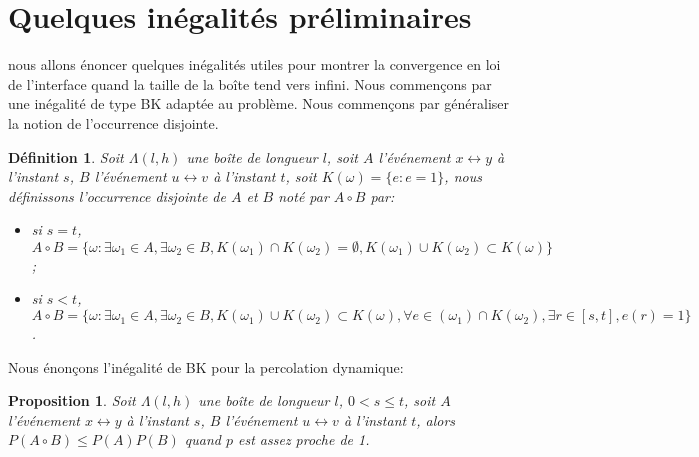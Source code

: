 \documentclass[titlepage,a4paper,12pt]{article}
\newcounter{def}
\newcounter{prop}
\newtheorem{occ}[def]{Définition}
\newtheorem{bk}[prop]{Proposition}
\begin{document}
\section{Quelques inégalités préliminaires}
nous allons énoncer quelques inégalités utiles pour montrer la convergence en loi de l'interface quand la taille de la boîte tend vers infini. Nous commençons par une inégalité de type BK adaptée au problème. Nous commençons par généraliser la notion de l'occurrence disjointe.

\begin{occ}
Soit $\Lambda(l,h)$ une boîte de longueur $l$, soit $A$ l'événement $x\longleftrightarrow y$ à l'instant $s$, $B$ l'événement $u\longleftrightarrow v$ à l'instant $t$, soit $K(\omega) = \{e: e=1\}$, nous définissons l'occurrence disjointe de $A$ et $B$ noté par $A\circ B$ par:
\begin{itemize}[leftmargin=*]
\item si $s=t$, $A\circ B = \{\omega: \exists\omega_1\in A,\exists\omega_2\in B, K(\omega_1)\cap K(\omega_2) = \emptyset, K(\omega_1)\cup K(\omega_2)\subset K(\omega) \}$;
\item si $s<t$, $A\circ B = \{\omega: \exists\omega_1\in A,\exists\omega_2\in B, K(\omega_1)\cup K(\omega_2)\subset K(\omega), \forall e\in (\omega_1)\cap K(\omega_2), \exists r\in [s,t], e(r) = 1 \}$.
\end{itemize}
\end{occ}
Nous énonçons l'inégalité de BK pour la percolation dynamique:

\begin{bk}
Soit $\Lambda(l,h)$ une boîte de longueur $l$, $0<s\leqslant t$, soit $A$ l'événement $x\longleftrightarrow y$ à l'instant $s$, $B$ l'événement $u\longleftrightarrow v$ à l'instant $t$, alors $P(A\circ B) \leqslant P(A)P(B)$ quand $p$ est assez proche de 1.
\end{bk}
\end{document}
